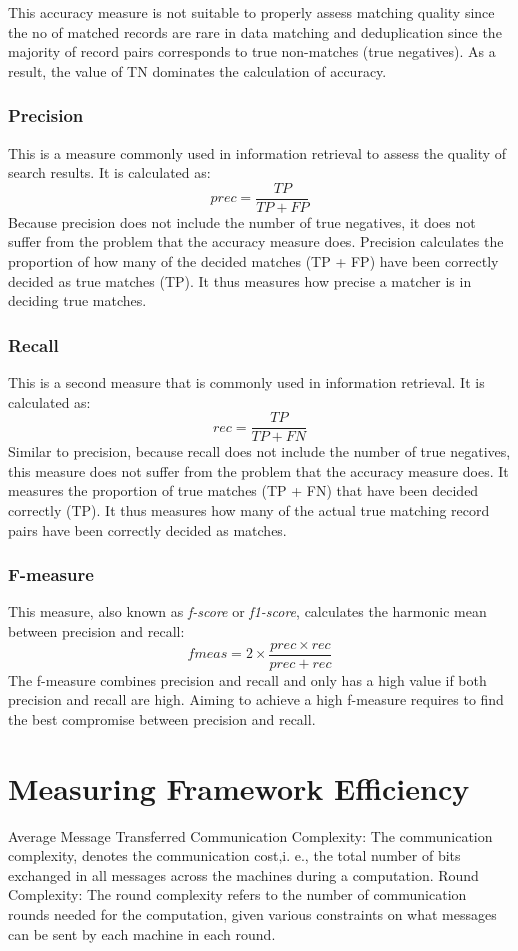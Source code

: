 This accuracy measure is not suitable to properly assess matching quality since the no of matched records are rare in data matching and deduplication since the majority of record pairs corresponds to true non-matches (true negatives). As a result, the value of TN dominates the calculation of accuracy.
\subsubsection{Precision}
This is a measure commonly used in information retrieval to assess the quality of search results. It is calculated as:
$$ prec=\frac{TP}{TP+FP}$$
Because precision does not include the number of true negatives, it does not suffer from the problem that the accuracy measure does. Precision calculates the proportion of how many of the decided matches (TP + FP) have been correctly decided as true matches (TP). It thus measures how precise a matcher is in deciding true matches.
\subsubsection{Recall}
This is a second measure that is commonly used in information retrieval. It is calculated as:
$$ rec=\frac{TP}{TP+FN}$$
Similar to precision, because recall does not include the number of true negatives, this measure does not suffer from the problem that the accuracy measure does. It measures the proportion of true matches (TP + FN) that have been decided correctly (TP). It thus measures how many of the actual true matching record pairs have been correctly decided as matches.
\subsubsection{F-measure}
This measure, also known as \textit{f-score} or \textit{f1-score}, calculates the harmonic mean between precision and recall:
$$ fmeas=2 \times \frac{prec\times rec}{prec+rec}$$
The f-measure combines precision and recall and only has a high value if both precision and recall are high. Aiming to achieve a high f-measure requires to find the best compromise between precision and recall.

\section{Measuring Framework Efficiency}
Average Message Transferred
Communication Complexity: The communication complexity, denotes the communication cost,i. e., the total number of bits exchanged in all messages across the machines during a computation\cite{WoZh13}.
Round Complexity: The round complexity refers to the number of communication rounds needed for the computation, given various constraints on what messages can be sent by each machine in each round\cite{WoZh13}.
